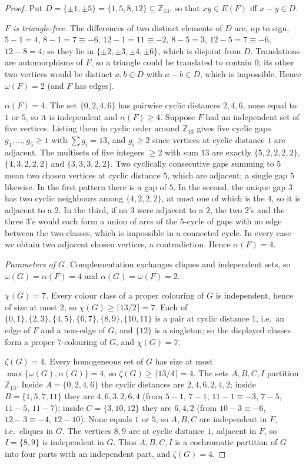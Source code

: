 \documentclass[11pt,a4paper]{article}
\theoremstyle{plain}
\theoremstyle{definition}
\theoremstyle{remark}
\newcommand{\Z}{\mathbb Z}
\begin{document}
\label{pf:seed}
\propseed*
\begin{proof}
Put $D=\{\pm1,\pm5\}=\{1,5,8,12\}\subseteq\Z_{13}$, so that $xy\in E(F)$ iff $x-y\in D$.

\emph{$F$ is triangle-free.} The differences of two distinct elements of $D$ are, up to sign, $5-1=4$, $8-1=7\equiv-6$, $12-1=11\equiv-2$, $8-5=3$, $12-5=7\equiv-6$, $12-8=4$; so they lie in $\{\pm2,\pm3,\pm4,\pm6\}$, which is disjoint from $D$. Translations are automorphisms of $F$, so a triangle could be translated to contain $0$; its other two vertices would be distinct $a,b\in D$ with $a-b\in D$, which is impossible. Hence $\omega(F)=2$ (and $F$ has edges).

\emph{$\alpha(F)=4$.} The set $\{0,2,4,6\}$ has pairwise cyclic distances $2,4,6$, none equal to $1$ or $5$, so it is independent and $\alpha(F)\ge4$. Suppose $F$ had an independent set of five vertices. Listing them in cyclic order around $\Z_{13}$ gives five cyclic gaps $g_1,\dots,g_5\ge1$ with $\sum g_i=13$, and $g_i\ge2$ since vertices at cyclic distance $1$ are adjacent. The multisets of five integers $\ge2$ with sum $13$ are exactly $\{5,2,2,2,2\}$, $\{4,3,2,2,2\}$ and $\{3,3,3,2,2\}$. Two cyclically consecutive gaps summing to $5$ mean two chosen vertices at cyclic distance $5$, which are adjacent; a single gap $5$ likewise. In the first pattern there is a gap of $5$. In the second, the unique gap $3$ has two cyclic neighbours among $\{4,2,2,2\}$, at most one of which is the $4$, so it is adjacent to a $2$. In the third, if no $3$ were adjacent to a $2$, the two $2$'s and the three $3$'s would each form a union of arcs of the $5$-cycle of gaps with no edge between the two classes, which is impossible in a connected cycle. In every case we obtain two adjacent chosen vertices, a contradiction. Hence $\alpha(F)=4$.

\emph{Parameters of $G$.} Complementation exchanges cliques and independent sets, so $\omega(G)=\alpha(F)=4$ and $\alpha(G)=\omega(F)=2$.

\emph{$\chi(G)=7$.} Every colour class of a proper colouring of $G$ is independent, hence of size at most $2$, so $\chi(G)\ge\lceil13/2\rceil=7$. Each of $\{0,1\},\{2,3\},\{4,5\},\{6,7\},\{8,9\},\{10,11\}$ is a pair at cyclic distance $1$, i.e.\ an edge of $F$ and a non-edge of $G$, and $\{12\}$ is a singleton; so the displayed classes form a proper $7$-colouring of $G$, and $\chi(G)=7$.

\emph{$\zeta(G)=4$.} Every homogeneous set of $G$ has size at most $\max\{\omega(G),\alpha(G)\}=4$, so $\zeta(G)\ge\lceil13/4\rceil=4$. The sets $A,B,C,I$ partition $\Z_{13}$. Inside $A=\{0,2,4,6\}$ the cyclic distances are $2,4,6,2,4,2$; inside $B=\{1,5,7,11\}$ they are $4,6,3,2,6,4$ (from $5-1$, $7-1$, $11-1\equiv-3$, $7-5$, $11-5$, $11-7$); inside $C=\{3,10,12\}$ they are $6,4,2$ (from $10-3\equiv-6$, $12-3\equiv-4$, $12-10$). None equals $1$ or $5$, so $A,B,C$ are independent in $F$, i.e.\ cliques in $G$. The vertices $8,9$ are at cyclic distance $1$, adjacent in $F$, so $I=\{8,9\}$ is independent in $G$. Thus $A,B,C,I$ is a cochromatic partition of $G$ into four parts with an independent part, and $\zeta(G)=4$.
\end{proof}
\end{document}
